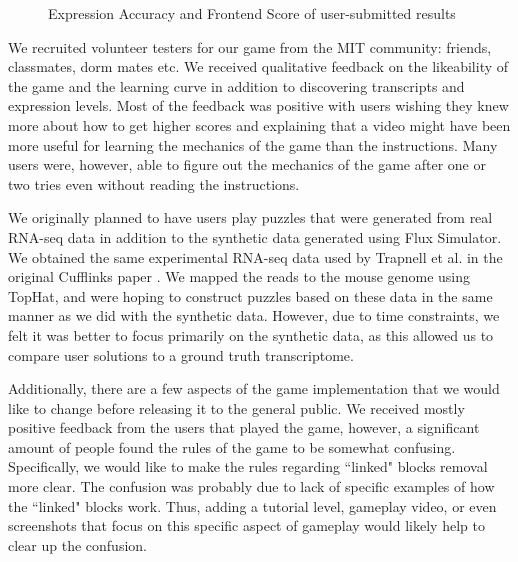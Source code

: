 \documentclass[12pt]{article}
\begin{document}
\begin{figure}[H]
\centering
{}
\caption{Expression Accuracy and Frontend Score of user-submitted results}\label{fig:score}
\end{figure}

We recruited volunteer testers for our game from the MIT community: friends, classmates, dorm mates etc. We received qualitative feedback on the likeability of the game and the learning curve in addition to discovering transcripts and expression levels. Most of the feedback was positive with users wishing they knew more about how to get higher scores and explaining that a video might have been more useful for learning the mechanics of the game than the instructions. Many users were, however, able to figure out the mechanics of the game after one or two tries even without reading the instructions.

We originally planned to have users play puzzles that were generated from real RNA-seq data in addition to the synthetic data generated using Flux Simulator.
We obtained the same experimental RNA-seq data used by Trapnell et al. in the original Cufflinks paper \citep{trapnell2010transcript}. We mapped the reads to 
the mouse genome using TopHat, and were hoping to construct puzzles based on these data in the same manner as we did with the synthetic data. However, due
to time constraints, we felt it was better to focus primarily on the synthetic data, as this allowed us to compare user solutions to a ground truth transcriptome.

Additionally, there are a few aspects of the game implementation that we would like to change before releasing it to the general public. We received mostly
positive feedback from the users that played the game, however, a significant amount of people found the rules of the game to be somewhat confusing. Specifically,
we would like to make the rules regarding ``linked" blocks removal more clear. The confusion was probably due to lack of specific examples of how the ``linked" blocks
work. Thus, adding a tutorial level, gameplay video, or even screenshots that focus on this specific aspect of gameplay would likely help to clear up the confusion.
\end{document}
